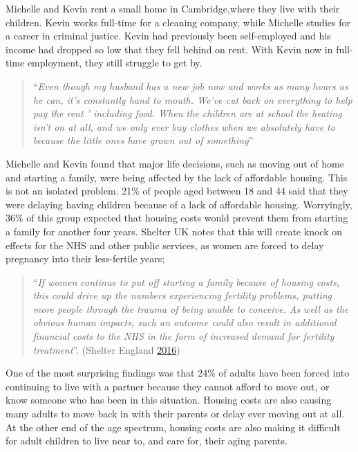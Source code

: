 \documentclass[]{tufte-handout}
\begin{document}
Michelle and Kevin rent a small home in Cambridge,where they live with
their children. Kevin works full-time for a cleaning company, while
Michelle studies for a career in criminal justice. Kevin had previously
been self-employed and his income had dropped so low that they fell
behind on rent. With Kevin now in full-time employment, they still
struggle to get by.

\begin{quote}
``\emph{Even though my husband has a new job now and works as many hours
as he can, it's constantly hand to mouth. We've cut back on everything
to help pay the rent ' including food. When the children are at school
the heating isn't on at all, and we only ever buy clothes when we
absolutely have to because the little ones have grown out of
something}''
\end{quote}

Michelle and Kevin found that major life decisions, such as moving out
of home and starting a family, were being affected by the lack of
affordable housing. This is not an isolated problem. 21\% of people aged
between 18 and 44 said that they were delaying having children because
of a lack of affordable housing. Worryingly, 36\% of this group expected
that housing costs would prevent them from starting a family for another
four years. Shelter UK notes that this will create knock on effects for
the NHS and other public services, as women are forced to delay
pregnancy into their less-fertile years;

\begin{quote}
``\emph{If women continue to put off starting a family because of
housing costs, this could drive up the numbers experiencing fertility
problems, putting more people through the trauma of being unable to
conceive. As well as the obvious human impacts, such an outcome could
also result in additional financial costs to the NHS in the form of
increased demand for fertility treatment}''. (Shelter England
\protect\hyperlink{ref-ShelterEngland2016}{2016})
\end{quote}

One of the most surprising findings was that 24\% of adults have been
forced into continuing to live with a partner because they cannot afford
to move out, or know someone who has been in this situation. Housing
costs are also causing many adults to move back in with their parents or
delay ever moving out at all. At the other end of the age spectrum,
housing costs are also making it difficult for adult children to live
near to, and care for, their aging parents.
\end{document}
